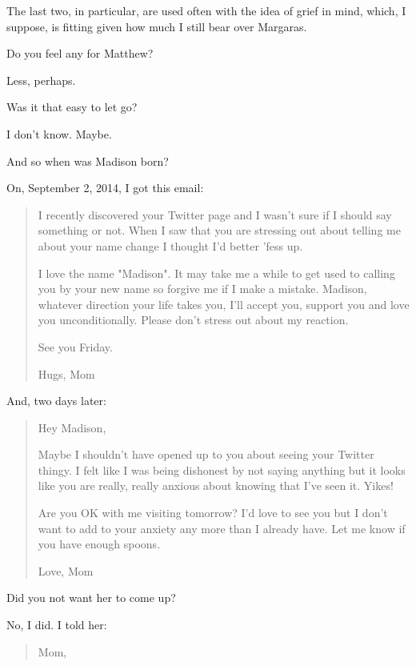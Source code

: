 \begin{paracol}{2}
\begin{leftcolumn}
The last two, in particular, are used often with the idea of grief in mind, which, I suppose, is fitting given how much I still bear over Margaras.

\begin{ally}
Do you feel any for Matthew?
\end{ally}
Less, perhaps.

\begin{ally}
Was it that easy to let go?
\end{ally}
I don't know. Maybe.
\newpage

\begin{ally}
And so when was Madison born?
\end{ally}
On, September 2, 2014, I got this email:

\begin{quotation}
I recently discovered your Twitter page and I wasn't sure if I should say something or not.  When I saw that you are stressing out about telling me about your name change I thought I'd better 'fess up.

I love the name "Madison".  It may take me a while to get used to calling you by your new name so forgive me if I make a mistake.  Madison, whatever direction your life takes you, I'll accept you, support you and love you unconditionally.  Please don't stress out about my reaction.

See you Friday.

Hugs,
Mom
\end{quotation}

And, two days later:

\begin{quotation}
Hey Madison,

Maybe I shouldn't have opened up to you about seeing your Twitter thingy.  I felt like I was being dishonest by not saying anything but it looks like you are really, really anxious about knowing that I've seen it.  Yikes!

Are you OK with me visiting tomorrow?  I'd love to see you but I don't want to add to your anxiety any more than I already have.  Let me know if you have enough spoons.

Love,
Mom
\end{quotation}

\begin{ally}
Did you not want her to come up?
\end{ally}
No, I did. I told her:

\begin{quotation}
Mom,


\end{quotation}
\end{leftcolumn}
\end{paracol}
